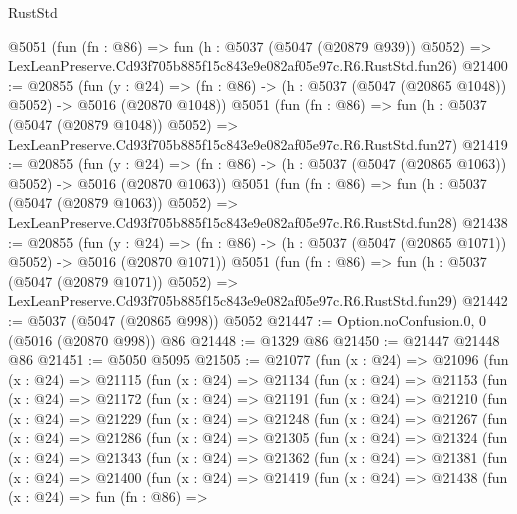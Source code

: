 \begin{lexlean}{RustStd}
\begin{coremodule}
    @5051
    (fun (fn : @86) =>
    fun (h : @5037 (@5047 (@20879 @939)) @5052) =>
    LexLeanPreserve.Cd93f705b885f15c843e9e082af05e97c.R6.RustStd.fun26)
@21400 := @20855
    (fun (y : @24) =>
    (fn : @86) -> (h : @5037 (@5047 (@20865 @1048)) @5052) -> @5016 (@20870 @1048))
    @5051
    (fun (fn : @86) =>
    fun (h : @5037 (@5047 (@20879 @1048)) @5052) =>
    LexLeanPreserve.Cd93f705b885f15c843e9e082af05e97c.R6.RustStd.fun27)
@21419 := @20855
    (fun (y : @24) =>
    (fn : @86) -> (h : @5037 (@5047 (@20865 @1063)) @5052) -> @5016 (@20870 @1063))
    @5051
    (fun (fn : @86) =>
    fun (h : @5037 (@5047 (@20879 @1063)) @5052) =>
    LexLeanPreserve.Cd93f705b885f15c843e9e082af05e97c.R6.RustStd.fun28)
@21438 := @20855
    (fun (y : @24) =>
    (fn : @86) -> (h : @5037 (@5047 (@20865 @1071)) @5052) -> @5016 (@20870 @1071))
    @5051
    (fun (fn : @86) =>
    fun (h : @5037 (@5047 (@20879 @1071)) @5052) =>
    LexLeanPreserve.Cd93f705b885f15c843e9e082af05e97c.R6.RustStd.fun29)
@21442 := @5037 (@5047 (@20865 @998)) @5052
@21447 := Option.noConfusion.{0, 0} (@5016 (@20870 @998)) @86
@21448 := @1329 @86
@21450 := @21447 @21448 @86
@21451 := @5050 @5095
@21505 := @21077
    (fun (x : @24) =>
    @21096
      (fun (x : @24) =>
      @21115
        (fun (x : @24) =>
        @21134
          (fun (x : @24) =>
          @21153
            (fun (x : @24) =>
            @21172
              (fun (x : @24) =>
              @21191
                (fun (x : @24) =>
                @21210
                  (fun (x : @24) =>
                  @21229
                    (fun (x : @24) =>
                    @21248
                      (fun (x : @24) =>
                      @21267
                        (fun (x : @24) =>
                        @21286
                          (fun (x : @24) =>
                          @21305
                            (fun (x : @24) =>
                            @21324
                              (fun (x : @24) =>
                              @21343
                                (fun (x : @24) =>
                                @21362
                                  (fun (x : @24) =>
                                  @21381
                                    (fun (x : @24) =>
                                    @21400
                                      (fun (x : @24) =>
                                      @21419
                                        (fun (x : @24) =>
                                        @21438
                                          (fun (x : @24) =>
                                          fun (fn : @86) =>

\end{coremodule}
\end{lexlean}
